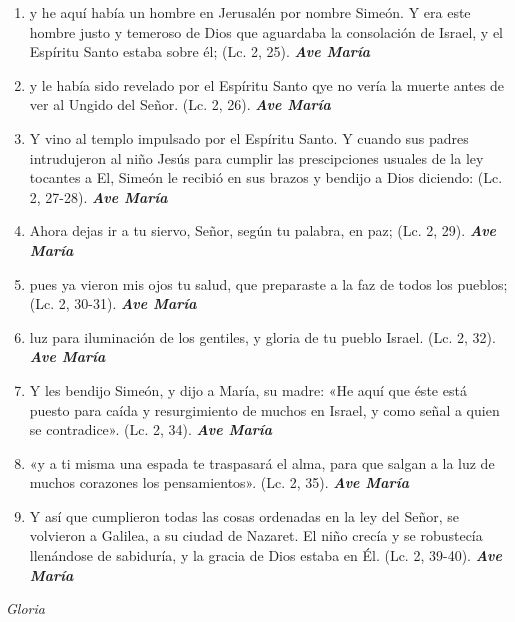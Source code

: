 \documentclass[a4paper,11pt, oneside]{report}
\begin{document}
{{\begin{enumerate}
      \item y he aquí había un hombre en Jerusalén por nombre Simeón. Y era este hombre justo y temeroso de Dios que aguardaba la consolación de Israel, 
      y el Espíritu Santo estaba sobre él; (Lc. 2, 25). \textbf{\textit{Ave María}}

      \item y le había sido revelado por el Espíritu Santo qye no vería la muerte antes de ver al Ungido del Señor. (Lc. 2, 26). \textbf{\textit{Ave María}}

      \item Y vino al templo impulsado por el Espíritu Santo. Y cuando sus padres intrudujeron al niño Jesús para cumplir las prescipciones usuales
      de la ley tocantes a El, Simeón le recibió en sus brazos y bendijo a Dios diciendo: (Lc. 2, 27-28). \textbf{\textit{Ave María}}

      \item Ahora dejas ir a tu siervo, Señor, según tu palabra, en paz; (Lc. 2, 29). \textbf{\textit{Ave María}}

      \item pues ya vieron mis ojos tu salud, que preparaste a la faz de todos los pueblos; (Lc. 2, 30-31). \textbf{\textit{Ave María}}

      \item luz para iluminación de los gentiles, y gloria de tu pueblo Israel. (Lc. 2, 32). \textbf{\textit{Ave María}}

      \item Y les bendijo Simeón, y dijo a María, su madre: «He aquí que éste está puesto para caída y resurgimiento de muchos en Israel, y como
      señal a quien se contradice». (Lc. 2, 34). \textbf{\textit{Ave María}}

      \item «y a ti misma una espada te traspasará el alma, para que salgan a la luz de muchos corazones los pensamientos». (Lc. 2, 35). \textbf{\textit{Ave María}}

      \item Y así que cumplieron todas las cosas ordenadas en la ley del Señor, se volvieron a Galilea, a su ciudad de Nazaret. El niño crecía
      y se robustecía llenándose de sabiduría, y la gracia de Dios estaba en Él. (Lc. 2, 39-40). \textbf{\textit{Ave María}} 

    \end{enumerate}
    \indent\textit{Gloria}
      
}}
\end{document}
